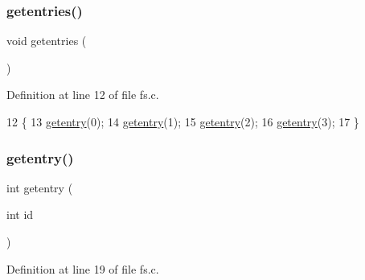 \subsubsection{\texorpdfstring{getentries()}{getentries()}}
{\footnotesize\ttfamily void getentries (\begin{DoxyParamCaption}{ }\end{DoxyParamCaption})}



Definition at line 12 of file fs.\+c.


\begin{DoxyCode}
12                   \{
13     \hyperlink{a00143_a3fb32d07d3bd05144a196c94fc59c0d1_a3fb32d07d3bd05144a196c94fc59c0d1}{getentry}(0);
14     \hyperlink{a00143_a3fb32d07d3bd05144a196c94fc59c0d1_a3fb32d07d3bd05144a196c94fc59c0d1}{getentry}(1);
15     \hyperlink{a00143_a3fb32d07d3bd05144a196c94fc59c0d1_a3fb32d07d3bd05144a196c94fc59c0d1}{getentry}(2);
16     \hyperlink{a00143_a3fb32d07d3bd05144a196c94fc59c0d1_a3fb32d07d3bd05144a196c94fc59c0d1}{getentry}(3);
17 \}
\end{DoxyCode}
\mbox{\label{a00143_a3fb32d07d3bd05144a196c94fc59c0d1_a3fb32d07d3bd05144a196c94fc59c0d1}} 
\subsubsection{\texorpdfstring{getentry()}{getentry()}}
{\footnotesize\ttfamily int getentry (\begin{DoxyParamCaption}\item[{int}]{id }\end{DoxyParamCaption})}



Definition at line 19 of file fs.\+c.


